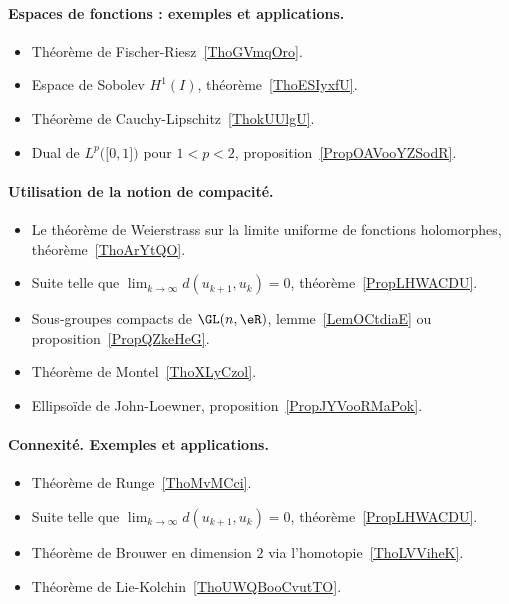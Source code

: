 \paragraph{Espaces de fonctions : exemples et applications.}
\begin{itemize}
    \item Théorème de Fischer-Riesz~\ref{ThoGVmqOro}.
    \item Espace de Sobolev \( H^1(I)\), théorème~\ref{ThoESIyxfU}.
    \item Théorème de Cauchy-Lipschitz~\ref{ThokUUlgU}.
    \item Dual de \( L^p\big( \mathopen[ 0 , 1 \mathclose] \big)\) pour \( 1<p<2\), proposition~\ref{PropOAVooYZSodR}.
\end{itemize}

\paragraph{Utilisation de la notion de compacité.}
\begin{itemize}
    \item Le théorème de Weierstrass sur la limite uniforme de fonctions holomorphes, théorème~\ref{ThoArYtQO}.
    \item Suite telle que \( \lim_{k\to \infty} d(u_{k+1},u_k)=0\), théorème~\ref{PropLHWACDU}.
    \item Sous-groupes compacts de \( \GL(n,\eR)\), lemme~\ref{LemOCtdiaE} ou proposition~\ref{PropQZkeHeG}.
    \item Théorème de Montel~\ref{ThoXLyCzol}.
    \item Ellipsoïde de John-Loewner, proposition~\ref{PropJYVooRMaPok}.
\end{itemize}

\paragraph{Connexité. Exemples et applications.}
\begin{itemize}
    \item Théorème de Runge~\ref{ThoMvMCci}.
    \item Suite telle que \( \lim_{k\to \infty} d(u_{k+1},u_k)=0\), théorème~\ref{PropLHWACDU}.
    \item Théorème de Brouwer en dimension \( 2\) via l'homotopie~\ref{ThoLVViheK}.
    \item Théorème de Lie-Kolchin~\ref{ThoUWQBooCvutTO}.
\end{itemize}
